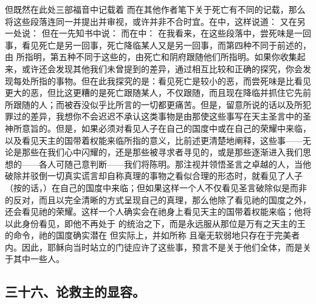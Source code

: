 但既然在此处三部福音中记载着 而在其他作者笔下关于死亡有不同的记载，那么将这些段落连同一并提出并审视，或许并非不合时宜。在中，这样说道： 又在另一处说： 但在一先知书中说：  而在中：  在我看来，在这些段落中，尝死味是一回事，看见死亡是另一回事，死亡降临某人又是另一回事，而第四种不同于前述的，由 所指明，第五种不同于这些的，由死亡和阴府跟随他们所指明。如果你收集起来，或许还会发现其他我们未曾提到的差异，通过相互比较和正确的探究，你会发现每处所指的事物。但在此我探究的是：看见死亡是较小的恶，而尝死味是比看见更大的恶，但比这更糟的是死亡跟随某人，不仅跟随，而且现在降临并抓住它先前所跟随的人；而被吞没似乎比所言的一切都更痛苦。但是，留意所说的话以及所犯罪过的差异，我想你不会迟迟不承认这类事物是由那使这些事写在天主圣言中的圣神所意旨的。但是，如果必须对看见人子在自己的国度中或在自己的荣耀中来临，以及看见天主的国带着权能来临所指的意义，比前述更清楚地阐释，这些事——无论是那些在我们心中闪耀的，还是那些被寻求者寻见的，或是那些逐渐进入我们思想的——各人可随己意判断——我们将陈明。那注视并领悟圣言之卓越的人，当他破除并驳倒一切真实谎言却自称真理的事物之看似合理的形态时，就看见了人子（按的话，）在自己的国度中来临；但如果这样一个人不仅看见圣言破除似是而非的反对，而且以完全清晰的方式呈现自己的真理，那么他除了看见祂的国度之外，还会看见祂的荣耀。这样一个人确实会在祂身上看见天主的国带着权能来临；他将以此身份看见，即他不再处于  的统治之下，而是永远服从那位是万有之天主的王的命令，祂的国度确实潜在  但实际上，并如所称 且毫无软弱地只存在于完美者内。因此，耶稣向当时站立的门徒应许了这些事，预言不是关于他们全体，而是关于其中一些人。\par


\subsection{三十六、论救主的显容。}


